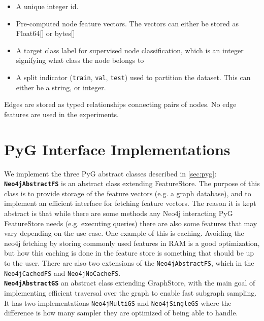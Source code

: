 \begin{itemize}
    \item A unique integer id.
    \item Pre-computed node feature vectors. The vectors can either be stored as Float64[] or bytes[]
    \item A target class label for supervised node classification, which is an integer signifying what class the node belongs to
    \item A split indicator (\texttt{train}, \texttt{val}, \texttt{test}) used to
    partition the dataset. This can either be a string, or integer.
\end{itemize}

Edges are stored as typed relationships connecting pairs of nodes. No edge features
are used in the experiments.


\section{PyG Interface Implementations}\label{sec:pyg_impl}

We implement the three PyG abstract classes described in \autoref{sec:pyg}:\\

\noindent \textbf{\texttt{Neo4jAbstractFS}} is an abstract class extending FeatureStore. The
 purpose of this class is to provide storage of the feature vectors (e.g. a graph database), and
 to implement an efficient interface for fetching feature vectors. The reason it is kept abstract
is that while there are some methods any Neo4j interacting PyG FeatureStore needs (e.g. executing queries)
there are also some features that may vary depending on the use case. One example of this is caching.
Avoiding the neo4j fetching by storing commonly used features in RAM is a good optimization, but how this 
caching is done in the feature store is something that should be up to the user. There are also two extensions of the 
\texttt{Neo4jAbstractFS}, which in the \texttt{Neo4jCachedFS} and \texttt{Neo4jNoCacheFS}.\\

\noindent \textbf{\texttt{Neo4jAbstractGS}} an abstract class extending GraphStore, with the main goal
of implementing efficient traversal over the graph to enable fast subgraph sampling. It has two implementations
\texttt{Neo4jMultiGS} and \texttt{Neo4jSingleGS} where the difference is how many sampler they are 
optimized of being able to handle.\\

